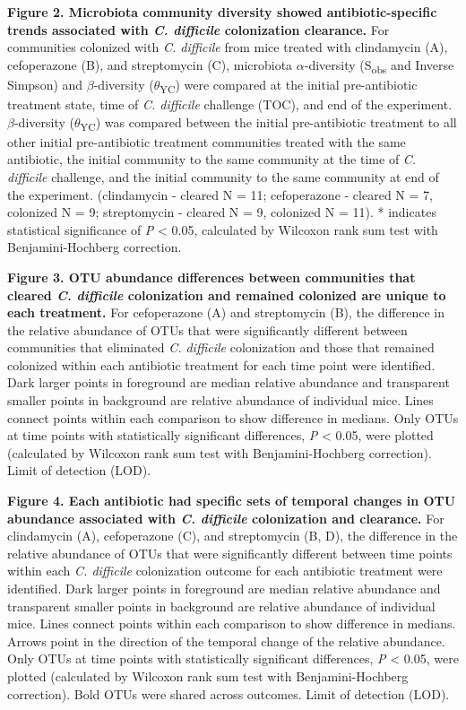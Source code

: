 \documentclass[12pt,]{article}
\begin{document}
\textbf{Figure 2. Microbiota community diversity showed
antibiotic-specific trends associated with \emph{C. difficile}
colonization clearance.} For communities colonized with \emph{C.
difficile} from mice treated with clindamycin (A), cefoperazone (B), and
streptomycin (C), microbiota \(\alpha\)-diversity (S\textsubscript{obs}
and Inverse Simpson) and \(\beta\)-diversity
(\(\theta\)\textsubscript{YC}) were compared at the initial
pre-antibiotic treatment state, time of \emph{C. difficile} challenge
(TOC), and end of the experiment. \(\beta\)-diversity
(\(\theta\)\textsubscript{YC}) was compared between the initial
pre-antibiotic treatment to all other initial pre-antibiotic treatment
communities treated with the same antibiotic, the initial community to
the same community at the time of \emph{C. difficile} challenge, and the
initial community to the same community at end of the experiment.
(clindamycin - cleared N = 11; cefoperazone - cleared N = 7, colonized N
= 9; streptomycin - cleared N = 9, colonized N = 11). * indicates
statistical significance of \emph{P} \textless{} 0.05, calculated by
Wilcoxon rank sum test with Benjamini-Hochberg correction.

\hfill\break

\textbf{Figure 3. OTU abundance differences between communities that
cleared \emph{C. difficile} colonization and remained colonized are
unique to each treatment.} For cefoperazone (A) and streptomycin (B),
the difference in the relative abundance of OTUs that were significantly
different between communities that eliminated \emph{C. difficile}
colonization and those that remained colonized within each antibiotic
treatment for each time point were identified. Dark larger points in
foreground are median relative abundance and transparent smaller points
in background are relative abundance of individual mice. Lines connect
points within each comparison to show difference in medians. Only OTUs
at time points with statistically significant differences, \emph{P}
\textless{} 0.05, were plotted (calculated by Wilcoxon rank sum test
with Benjamini-Hochberg correction). Limit of detection (LOD).

\hfill\break

\textbf{Figure 4. Each antibiotic had specific sets of temporal changes
in OTU abundance associated with \emph{C. difficile} colonization and
clearance.} For clindamycin (A), cefoperazone (C), and streptomycin (B,
D), the difference in the relative abundance of OTUs that were
significantly different between time points within each \emph{C.
difficile} colonization outcome for each antibiotic treatment were
identified. Dark larger points in foreground are median relative
abundance and transparent smaller points in background are relative
abundance of individual mice. Lines connect points within each
comparison to show difference in medians. Arrows point in the direction
of the temporal change of the relative abundance. Only OTUs at time
points with statistically significant differences, \emph{P} \textless{}
0.05, were plotted (calculated by Wilcoxon rank sum test with
Benjamini-Hochberg correction). Bold OTUs were shared across outcomes.
Limit of detection (LOD).
\end{document}
